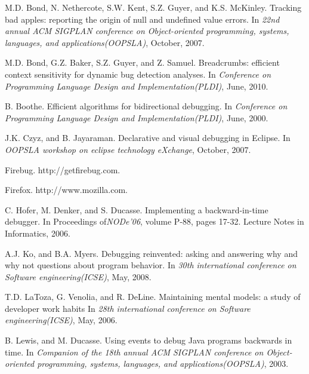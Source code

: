 \documentclass[runningheads,a4paper]{llncs}
\begin{document}
\begin{thebibliography}{16}
M.D. Bond, N. Nethercote, S.W. Kent, S.Z. Guyer, and K.S. McKinley. \newblock Tracking bad apples: reporting the origin of null and undefined value errors.
\newblock In \emph{22nd annual ACM SIGPLAN conference on Object-oriented programming, systems, languages, and applications(OOPSLA)},
October, 2007.

M.D. Bond, G.Z. Baker, S.Z. Guyer, and Z. Samuel. \newblock Breadcrumbs: efficient context sensitivity for dynamic bug detection analyses.
\newblock In \emph{Conference on Programming Language Design and Implementation(PLDI)},
June, 2010.

B. Boothe. \newblock Efficient algorithms for bidirectional debugging.
\newblock In \emph{Conference on Programming Language Design and Implementation(PLDI)},
June, 2000.

J.K. Czyz, and B. Jayaraman. \newblock Declarative and visual debugging in Eclipse.
\newblock In \emph{OOPSLA workshop on eclipse technology eXchange},
October, 2007.

Firebug. \newblock http://getfirebug.com.

Firefox. \newblock http://www.mozilla.com.

C. Hofer, M. Denker, and S. Ducasse. \newblock Implementing a backward-in-time debugger.
\newblock In Proceedings of\emph{NODe'06},
volume P-88, pages 17-32. Lecture Notes in Informatics, 2006.

A.J. Ko, and B.A. Myers. \newblock Debugging reinvented: asking and answering why and why not questions about program behavior.
\newblock In \emph{30th international conference on Software engineering(ICSE)},
May, 2008.

T.D. LaToza, G. Venolia, and R. DeLine. \newblock Maintaining mental models: a study of developer work habits
\newblock In \emph{28th international conference on Software engineering(ICSE)},
May, 2006.

B. Lewis, and M. Ducasse. \newblock Using events to debug Java programs backwards in time.
\newblock In \emph{Companion of the 18th annual ACM SIGPLAN conference on Object-oriented programming, systems, languages, and applications(OOPSLA)},
2003.


\end{thebibliography}
\end{document}
